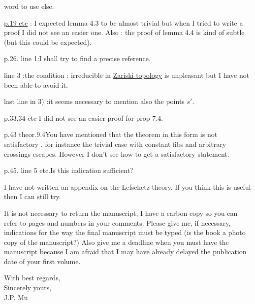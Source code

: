 word to use else.

\reversemarginpar
\margin{!}\uline{p.19 etc} : I expected lemma 4.3 to be almost trivial but when I tried to write a proof I did not see an easier one. Also : the proof of lemma 4.4 is kind of subtle (but this could be expected).

p.26. line 1:\quad I shall try to find a precise reference.

line 3 :\quad the condition : irreducible in \uline{Zariski topology} is unpleasant but I have not been able to avoid it.

last line in 3) :\quad it seems necessary to mention also the points $s'$.

p.33,34 etc \quad I did not see an easier proof for prop 7.4.

p.43 theor.9.4\quad You have mentioned that the theorem in this form is not satisfactory . for instance the trivial case with constant fibs and arbitrary crossings escapes. However I don't see how to get a satisfactory statement.

p.45. line 5 etc.\quad Is this indication sufficient?

I have not written an appendix on the Lefschetz theory. If you think this is useful then I can still try.
\normalmarginpar

It is not necessary to return the manuscript, I have a carbon copy so you can refer to pages and numbers in your comments. Please give me, if necessary, indications for the way the final manuscript must be typed (is the book a  photo copy of the manuscript?) Also give me a deadline when you must have the manuscript because I am afraid that I may have already delayed the publication date of your first volume.

With best regards,\\
Sincerely yours,\\
J.P. Mu\\
